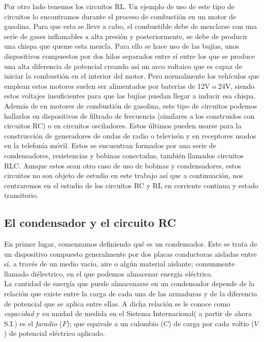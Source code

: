 \documentclass[../main.tex]{subfiles}
\begin{document}
Por otro lado tenemos los circuitos RL. Un ejemplo de uso de este tipo de circuitos lo encontramos durante el proceso de combustión en un motor de gasolina. Para que esta se lleve a cabo, el combustible debe de mezclarse con una serie de gases inflamables a alta presión y posteriormente, se debe de producir una chispa que queme esta mezcla. Para ello se hace uso de las bujías, unos dispositivos compuestos por dos hilos separados entre sí entre los que se produce una alta diferencia de potencial creando así un arco voltaico que es capaz de iniciar la combustión en el interior del motor. Pero normalmente los vehículos que emplean estos motores suelen ser alimentados por baterías de 12V o 24V, siendo estos voltajes insuficientes para que las bujías puedan llegar a inducir esa chispa.\\

Además de en motores de combustión de gasolina, este tipo de circuitos podemos hallarlos en dispositivos de filtrado de frecuencia (similares a los construidos con circuitos RC) o en circuitos osciladores. Estos últimos pueden usarse para la construcción de generadores de ondas de radio o televisón y en receptores usados en la telefonía móvil. Estos se encuentran formados por una serie de condensadores, resistencias y bobinas conectadas, también llamados circuitos RLC. Aunque estos sean otro caso de uso de bobinas y condensadores, estos circuitos no son objeto de estudio en este trabajo así que a continuación, nos centraremos en el estudio de los circuitos RC y RL en corriente continua y estado transitorio.


\subsection{El condensador y el circuito RC}
En primer lugar, comenzamos definiendo qué es un condensador. Este se trata de un dispositivo compuesto generalmente por dos placas conductoras aisladas entre sí, a través de un medio vacío, aire o algún material aislante; comunmente llamado diélectrico, en el que podemos almacenar energía eléctrica.\\ 

La cantidad de energía que puede almacenarse en un condensador depende de la relación que existe entre la carga de cada una de las armaduras y de la diferencia de potencial que se aplica entre ellas. A dicha relación se le conoce como \textit{capacidad} y su unidad de medida en el Sistema Internacional( a partir de ahora S.I.) es el \textit{faradio} ($F$); que equivale a un culombio ($C$) de carga por cada voltio ($V$) de potencial eléctrico aplicado.
\end{document}
